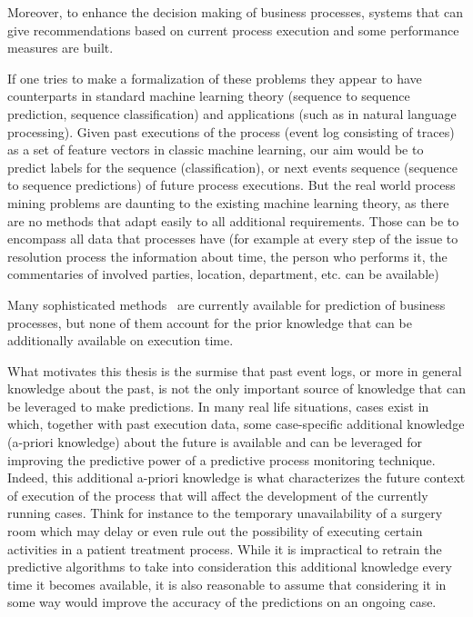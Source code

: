 Moreover, to enhance the decision making of business processes, systems that can give recommendations based on current process execution and some performance measures are built.  

If one tries to make a formalization of these problems they appear to have counterparts in standard machine learning theory (sequence to sequence prediction, sequence classification) and applications (such as in natural language processing). Given past executions of the process (event log consisting of traces) as a set of feature vectors in classic machine learning, our aim would be to predict labels for the sequence (classification), or next events sequence (sequence to sequence predictions) of future process executions. But the real world process mining problems are daunting to the existing machine learning theory, as there are no methods that adapt easily to all additional requirements. Those can be to encompass all data that processes have (for example at every step of the issue to resolution process the information about time, the person who performs it, the commentaries of involved parties, location, department, etc. can be available)

Many sophisticated methods~\cite{evermann,Polatoetal:2016,niek96732} are currently available for prediction of business processes, but none of them account for the prior knowledge that can be additionally available on execution time. 

What motivates this thesis is the surmise that past event logs, or more in general knowledge about the past, is not the only important source of knowledge that can be leveraged to make predictions. In many real life situations, cases exist in which, together with past execution data, some case-specific additional knowledge (a-priori knowledge) about the future is available and can be leveraged for improving the predictive power of a predictive process monitoring technique. Indeed, this additional a-priori knowledge is what characterizes the future context of execution of the process that will affect the development of the currently running cases. Think for instance to the temporary unavailability of a surgery room which may delay or even rule out the possibility of executing  certain activities in a patient treatment process. While it is impractical to retrain the predictive algorithms to take into consideration this additional knowledge every time it becomes available, it is also reasonable to assume that considering it in some way would improve the accuracy of the predictions on an ongoing case.

